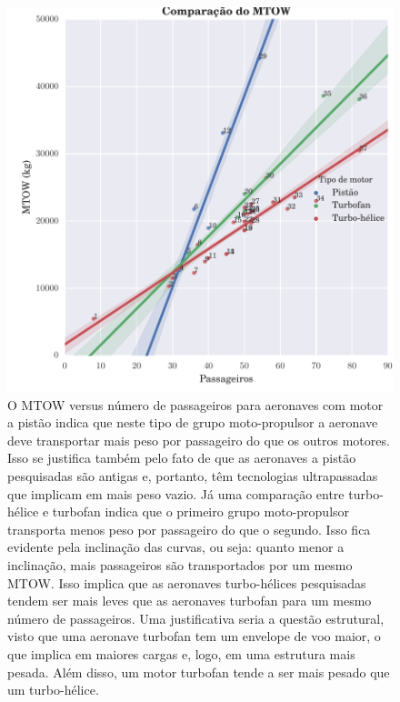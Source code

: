 \begin{figure}
\centering
\includegraphics{../autogenerated/graficos_comparativos/mtow.pdf}
\caption[Comparação do MTOW]{O MTOW versus número de passageiros para aeronaves com motor a pistão indica que neste tipo de grupo moto-propulsor a aeronave deve transportar mais peso por passageiro do que os outros motores.
Isso se justifica também pelo fato de que as aeronaves a pistão pesquisadas são antigas e, portanto, têm tecnologias ultrapassadas que implicam em mais peso vazio.
Já uma comparação entre turbo-hélice e turbofan indica que o primeiro grupo moto-propulsor transporta menos peso por passageiro do que o segundo.
Isso fica evidente pela inclinação das curvas, ou seja: quanto menor a inclinação, mais passageiros são transportados por um mesmo MTOW.
Isso implica que as aeronaves turbo-hélices pesquisadas tendem ser mais leves que as aeronaves turbofan para um mesmo número de passageiros.
Uma justificativa seria a questão estrutural, visto que uma aeronave turbofan tem um envelope de voo maior, o que implica em maiores cargas e, logo, em uma estrutura mais pesada.
Além disso, um motor turbofan tende a ser mais pesado que um turbo-hélice.}
\label{fig:mtow}
\end{figure}

